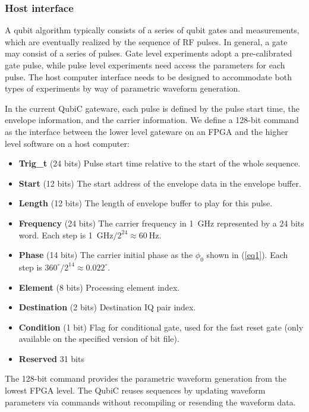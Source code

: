 \documentclass{ieeetran}
\begin{document}
\subsubsection{Host interface}
A qubit algorithm typically consists of a series of qubit gates and measurements, which are eventually realized by the sequence of RF pulses.
In general, a gate may consist of a series of pulses.
Gate level experiments adopt a pre-calibrated gate pulse, while pulse level experiments need access the parameters for each pulse. 
The host computer interface needs to be designed to accommodate both types of experiments by way of parametric waveform generation.

In the current QubiC gateware, each pulse is defined by the pulse start time, the envelope information, and the carrier information. 
We define a 128-bit command as the interface between the lower level gateware on an FPGA and the higher level software on a host computer:
\begin{itemize}
\item \textbf{Trig\_t} (24 bits) Pulse start time relative to the start of the whole sequence.
\item \textbf{Start} (12 bits) The start address of the envelope data in the envelope buffer.
\item \textbf{Length} (12 bits) The length of envelope buffer to play for this pulse.
\item \textbf{Frequency} (24 bits) The carrier frequency in 1~GHz represented by a 24 bits word. Each step is 1~$\mathrm{GHz}/2^{24}\approx60~\mathrm{Hz}$.
\item \textbf{Phase} (14 bits) The carrier initial phase as the $\phi_0$ shown in (\ref{eq1}). Each step is $360^\circ/2^{14}\approx 0.022^\circ$.
\item \textbf{Element} (8 bits) Processing element index.
\item \textbf{Destination} (2 bits) Destination IQ pair index.
\item \textbf{Condition} (1 bit) Flag for conditional gate, used for the fast reset gate (only available on the specified version of bit file).
\item \textbf{Reserved} 31 bits
\end{itemize}

The 128-bit command provides the parametric waveform generation from the lowest FPGA level.
The QubiC reuses sequences by updating waveform parameters via commands without recompiling or resending the waveform data.
\end{document}
